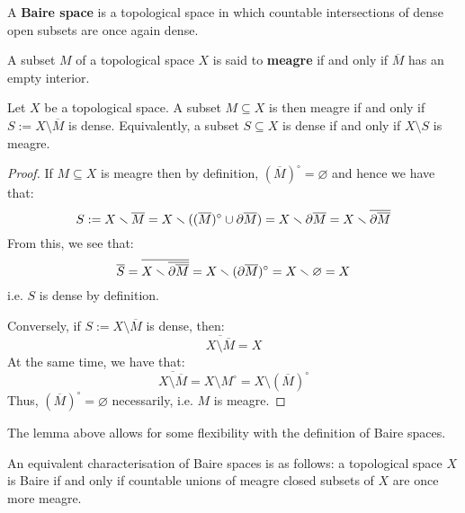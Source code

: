         \begin{definition} \label{def: baire_spaces}
            A \textbf{Baire space} is a topological space in which countable intersections of dense open subsets are once again dense.
        \end{definition}
        \begin{definition} \label{def: meagre_subsets}
            A subset $M$ of a topological space $X$ is said to \textbf{meagre} if and only if $\overline{M}$ has an empty interior. 
        \end{definition}
        \begin{lemma} \label{lemma: meagre_subsets_are_complements_of_dense_subsets}
            Let $X$ be a topological space. A subset $M \subseteq X$ is then meagre if and only if $S := X \setminus \overline{M}$ is dense. Equivalently, a subset $S \subseteq X$ is dense if and only if $X \setminus S$ is meagre.
        \end{lemma}
            \begin{proof}
                If $M \subseteq X$ is meagre then by definition, $(\overline{M})^{\circ} = \varnothing$ and hence we have that:
                    $$S := X \smallsetminus \overline{M} = X \smallsetminus ( (\overline{M})^{\circ} \cup \partial \overline{M} ) = X \smallsetminus \partial \overline{M} = X \smallsetminus \overline{\partial \overline{M}}$$
                From this, we see that:
                    $$\overline{S} = \overline{X \smallsetminus \overline{\partial \overline{M}}} = X \smallsetminus (\partial \overline{M})^{\circ} = X \smallsetminus \varnothing = X$$
                i.e. $S$ is dense by definition.
                
                Conversely, if $S := X \setminus \overline{M}$ is dense, then:
                    $$\overline{ X \setminus \overline{M} } = X$$
                At the same time, we have that:
                    $$\overline{ X \setminus \overline{M} } = X \setminus M^{\circ} = X \setminus (\overline{M})^{\circ}$$
                Thus, $(\overline{M})^{\circ} = \varnothing$ necessarily, i.e. $M$ is meagre.
            \end{proof}
        The lemma above allows for some flexibility with the definition of Baire spaces.
        \begin{lemma} \label{lemma: baire_spaces_via_meagre_subsets}
            An equivalent characterisation of Baire spaces is as follows: a topological space $X$ is Baire if and only if countable unions of meagre closed subsets of $X$ are once more meagre. 
        \end{lemma}
